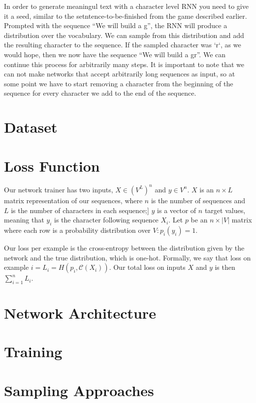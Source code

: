 \documentclass{article}
\begin{document}
In order to generate meaningul text with a character level RNN you need to give it a seed, similar to the setntence-to-be-finished from the game described earlier. Prompted with the sequence ``We will build a g'', the RNN will produce a distribution over the vocabulary. We can sample from this distribution and add the resulting character to the sequence. If the sampled character was `r`, as we would hope, then we now have the sequence ``We will build a gr''. We can continue this process for arbitrarily many steps. It is important to note that we can not make networks that accept arbitrarily long sequences as input, so at some point we have to start removing a character from the beginning of the sequence for every character we add to the end of the sequence.

\section{Dataset}


\section{Loss Function}


Our network trainer has two inputs, $X \in (V^L)^n$ and $y \in V^n$. $X$ is an $n \times L$ matrix representation of our sequences, where $n$ is the number of sequences and $L$ is the number of characters in each sequence;] $y$ is a vector of $n$ target values, meaning that $y_i$ is the character following sequence $X_i$. Let $p$ be an $n \times |V|$ matrix where each row is a probability distribution over $V : p_i(y_i) = 1$.

Our loss per example is the cross-entropy between the distribution given by the network and the true distribution, which is one-hot. Formally, we say that loss on example $i = L_i = H(p_i, \mathcal{C}(X_i))$. Our total loss on inputs $X$ and $y$ is then $ \sum_{i=1}^{n} L_i$.

\section{Network Architecture}

\section{Training}

\section{Sampling Approaches}
\end{document}
